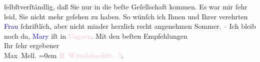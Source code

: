                     ſelbſtverſtändlig, daß Sie nur in die beſte Geſellschaft kommen.\pend
           \pstart
           Es war mir ſehr leid, Sie nicht mehr geſehen zu haben. So wünſch ich Ihnen und
                    Ihrer verehrten \textcolor{blue}{Frau}{}
                    ſchriftlich, aber nicht minder herzlich recht angenehmen Sommer. – Ich bleib
                    noch da, \textcolor{blue}{Mary}{}\ledrightnote{\textcolor{blue}{Maria Mell}} iſt in \textcolor{pink}{Ungarn}{}\ledrightnote{\textcolor{pink}{Ungarn}}.\pend
           \pstart
           Mit den beſten Empfehlungen{\\[\baselineskip]}Ihr ſehr ergebener{\\[\baselineskip]}\spacefill\mbox{Max Mell.}\pend
           \leftskip=0em{}\pstart
           \textcolor{pink}{II. Wittelsbachſtr. 5}{}\ledrightnote{\textcolor{pink}{Wittelsbachstraße}}.\pend
           \endnumbering{}  
      